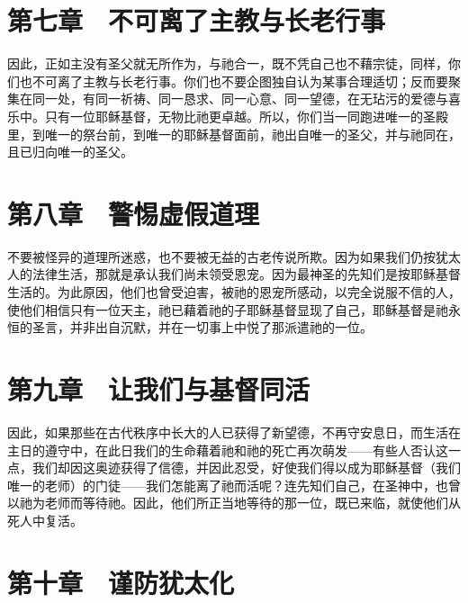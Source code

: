 
\section{第七章　不可离了主教与长老行事}

因此，正如主没有圣父就无所作为，与祂合一，既不凭自己也不藉宗徒，同样，你们也不可离了主教与长老行事。你们也不要企图独自认为某事合理适切；反而要聚集在同一处，有同一祈祷、同一恳求、同一心意、同一望德，在无玷污的爱德与喜乐中。只有一位耶稣基督，无物比祂更卓越。所以，你们当一同跑进唯一的圣殿里，到唯一的祭台前，到唯一的耶稣基督面前，祂出自唯一的圣父，并与祂同在，且已归向唯一的圣父。\par


\section{第八章　警惕虚假道理}

不要被怪异的道理所迷惑，也不要被无益的古老传说所欺。因为如果我们仍按犹太人的法律生活，那就是承认我们尚未领受恩宠。因为最神圣的先知们是按耶稣基督生活的。为此原因，他们也曾受迫害，被祂的恩宠所感动，以完全说服不信的人，使他们相信只有一位天主，祂已藉着祂的子耶稣基督显现了自己，耶稣基督是祂永恒的圣言，并非出自沉默，并在一切事上中悦了那派遣祂的一位。\par


\section{第九章　让我们与基督同活}

因此，如果那些在古代秩序中长大的人已获得了新望德，不再守安息日，而生活在主日的遵守中，在此日我们的生命藉着祂和祂的死亡再次萌发——有些人否认这一点，我们却因这奥迹获得了信德，并因此忍受，好使我们得以成为耶稣基督（我们唯一的老师）的门徒——我们怎能离了祂而活呢？连先知们自己，在圣神中，也曾以祂为老师而等待祂。因此，他们所正当地等待的那一位，既已来临，就使他们从死人中复活。\par


\section{第十章　谨防犹太化}

